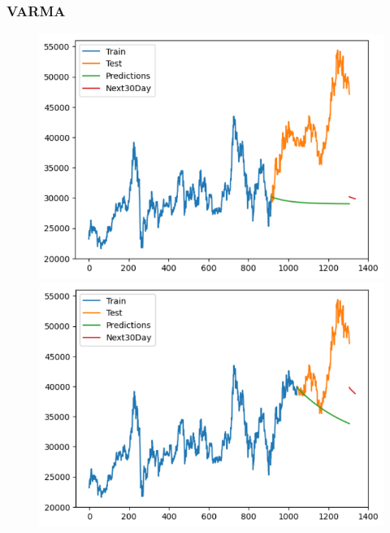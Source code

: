 \subsubsection{VARMA}
\begin{figure}[H]
    \centering
    \begin{minipage}{0.15\textwidth}
    \centering
    \includegraphics[width=1\textwidth]{resources/chapter-5/newdata/result/BIDV_VARMA_7-3.png}
    \end{minipage}
    \hfill
    \begin{minipage}{0.15\textwidth}
    \centering
    \includegraphics[width=1\textwidth]{resources/chapter-5/newdata/result/BIDV_VARMA_8-2.png}
    \end{minipage}
    \hfill
        \begin{minipage}{0.15\textwidth}

\end{minipage}
\end{figure}
